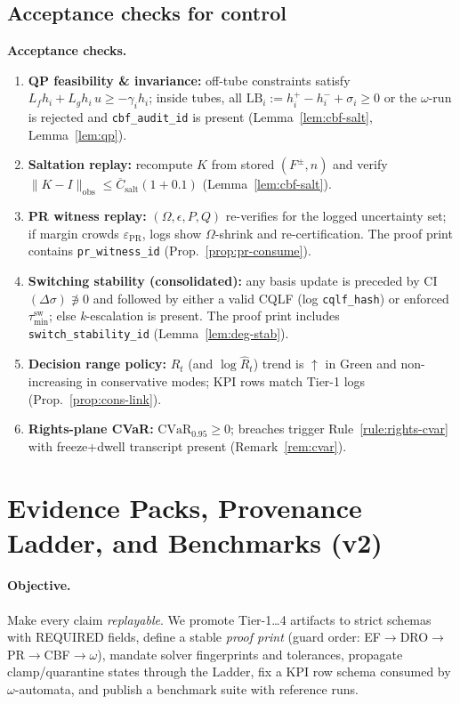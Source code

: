\documentclass[10pt]{article}
\newenvironment{acceptchecks}{\par\medskip\noindent\textbf{Acceptance checks.}\begin{enumerate}[leftmargin=*]}{\end{enumerate}\medskip}
\newenvironment{acceptchecks}{\begin{mdframed}\textbf{Acceptance checks.}\begin{enumerate}[leftmargin=*]}{\end{enumerate}\end{mdframed}}
\providecommand{\constsymPRmargin}{\varepsilon_{\mathrm{PR}}}
\begin{document}
\subsection{Acceptance checks for control}\label{subsec:ctrl-accept}
\begin{acceptchecks}
\item \textbf{QP feasibility \& invariance:} off-tube constraints satisfy $L_f h_i + L_g h_i\,u \ge -\gamma_i h_i$; inside tubes, all $\mathrm{LB}_i:=h_i^+-h_i^-+\sigma_i\ge 0$ or the $\omega$-run is rejected and \texttt{cbf\_audit\_id} is present (Lemma~\ref{lem:cbf-salt}, Lemma~\ref{lem:qp}).
\item \textbf{Saltation replay:} recompute $K$ from stored $(F^\pm,n)$ and verify $\|K-I\|_{\mathrm{obs}}\le \overline C_{\mathrm{salt}}(1+0.1)$ (Lemma~\ref{lem:cbf-salt}).
\item \textbf{PR witness replay:} $(\Omega,\epsilon,P,Q)$ re-verifies for the logged uncertainty set; if margin crowds $\constsymPRmargin$, logs show $\Omega$-shrink and re-certification. The proof print contains \texttt{pr\_witness\_id} (Prop.~\ref{prop:pr-consume}).
\item \textbf{Switching stability (consolidated):} any basis update is preceded by CI$(\Delta\sigma)\not\ni 0$ and followed by either a valid CQLF (log \texttt{cqlf\_hash}) or enforced $\tau_{\min}^{\mathrm{sw}}$; else \emph{k}-escalation is present. The proof print includes \texttt{switch\_stability\_id} (Lemma~\ref{lem:deg-stab}).
\item \textbf{Decision range policy:} $\hat R_t$ (and $\log \hat R_t$) trend is $\uparrow$ in Green and non-increasing in conservative modes; KPI rows match Tier-1 logs (Prop.~\ref{prop:cons-link}).
\item \textbf{Rights-plane CVaR:} $\mathrm{CVaR}_{0.95}\ge 0$; breaches trigger Rule~\ref{rule:rights-cvar} with freeze+dwell transcript present (Remark~\ref{rem:cvar}).
\end{acceptchecks}


\section{Evidence Packs, Provenance Ladder, and Benchmarks (v2)}\label{sec:pcc-bench-v2}

\paragraph{Objective.}
Make every claim \emph{replayable}. We promote Tier-1…4 artifacts to strict schemas with REQUIRED fields, define a stable \emph{proof print} (guard order: EF$\rightarrow$DRO$\rightarrow$PR$\rightarrow$CBF$\rightarrow\omega$), mandate solver fingerprints and tolerances, propagate clamp/quarantine states through the Ladder, fix a KPI row schema consumed by $\omega$-automata, and publish a benchmark suite with reference runs.
\end{document}
